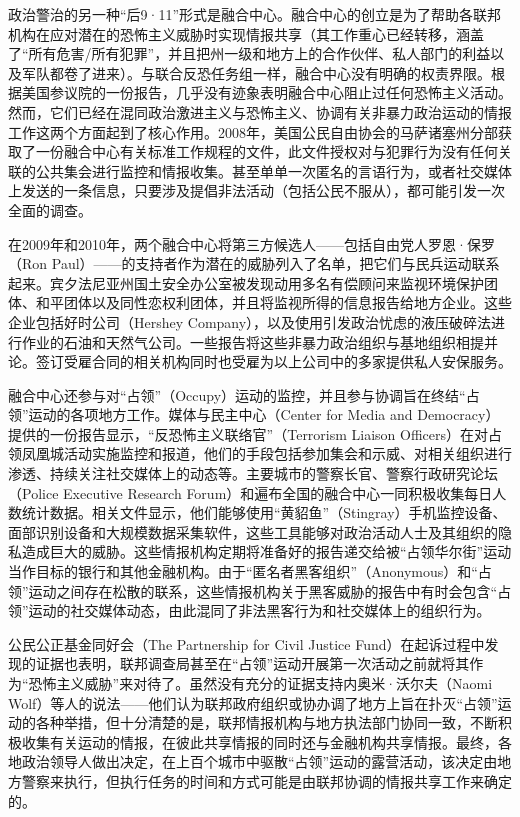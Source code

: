 \documentclass[fontset=fandol, a4paper, 12pt, openright]{ctexbook}
\begin{document}
政治警治的另一种“后9·11”形式是融合中心。融合中心的创立是为了帮助各联邦机构在应对潜在的恐怖主义威胁时实现情报共享（其工作重心已经转移，涵盖了“所有危害/所有犯罪”，并且把州一级和地方上的合作伙伴、私人部门的利益以及军队都卷了进来）。与联合反恐任务组一样，融合中心没有明确的权责界限。根据美国参议院的一份报告，几乎没有迹象表明融合中心阻止过任何恐怖主义活动。然而，它们已经在混同政治激进主义与恐怖主义、协调有关非暴力政治运动的情报工作这两个方面起到了核心作用。2008年，美国公民自由协会的马萨诸塞州分部获取了一份融合中心有关标准工作规程的文件，此文件授权对与犯罪行为没有任何关联的公共集会进行监控和情报收集。甚至单单一次匿名的言语行为，或者社交媒体上发送的一条信息，只要涉及提倡非法活动（包括公民不服从），都可能引发一次全面的调查。

在2009年和2010年，两个融合中心将第三方候选人——包括自由党人罗恩·保罗（Ron Paul）——的支持者作为潜在的威胁列入了名单，把它们与民兵运动联系起来。宾夕法尼亚州国土安全办公室被发现动用多名有偿顾问来监视环境保护团体、和平团体以及同性恋权利团体，并且将监视所得的信息报告给地方企业。这些企业包括好时公司（Hershey Company），以及使用引发政治忧虑的液压破碎法进行作业的石油和天然气公司。一些报告将这些非暴力政治组织与基地组织相提并论。签订受雇合同的相关机构同时也受雇为以上公司中的多家提供私人安保服务。

融合中心还参与对“占领”（Occupy）运动的监控，并且参与协调旨在终结“占领”运动的各项地方工作。媒体与民主中心（Center for Media and Democracy）提供的一份报告显示，“反恐怖主义联络官”（Terrorism Liaison Officers）在对占领凤凰城活动实施监控和报道，他们的手段包括参加集会和示威、对相关组织进行渗透、持续关注社交媒体上的动态等。主要城市的警察长官、警察行政研究论坛（Police Executive Research Forum）和遍布全国的融合中心一同积极收集每日人数统计数据。相关文件显示，他们能够使用“黄貂鱼”（Stingray）手机监控设备、面部识别设备和大规模数据采集软件，这些工具能够对政治活动人士及其组织的隐私造成巨大的威胁。这些情报机构定期将准备好的报告递交给被“占领华尔街”运动当作目标的银行和其他金融机构。由于“匿名者黑客组织”（Anonymous）和“占领”运动之间存在松散的联系，这些情报机构关于黑客威胁的报告中有时会包含“占领”运动的社交媒体动态，由此混同了非法黑客行为和社交媒体上的组织行为。

公民公正基金同好会（The Partnership for Civil Justice Fund）在起诉过程中发现的证据也表明，联邦调查局甚至在“占领”运动开展第一次活动之前就将其作为“恐怖主义威胁”来对待了。虽然没有充分的证据支持内奥米·沃尔夫（Naomi Wolf）等人的说法——他们认为联邦政府组织或协办调了地方上旨在扑灭“占领”运动的各种举措，但十分清楚的是，联邦情报机构与地方执法部门协同一致，不断积极收集有关运动的情报，在彼此共享情报的同时还与金融机构共享情报。最终，各地政治领导人做出决定，在上百个城市中驱散“占领”运动的露营活动，该决定由地方警察来执行，但执行任务的时间和方式可能是由联邦协调的情报共享工作来确定的。
\end{document}
